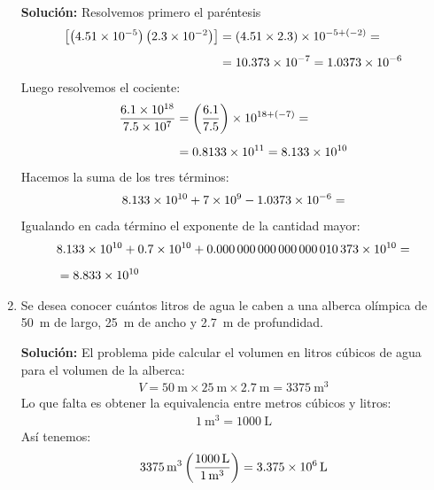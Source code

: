\documentclass[14pt]{extarticle}
\begin{document}
\begin{enumerate}
\textbf{Solución:} Resolvemos primero el paréntesis
\begin{align*}
\left[ \left( \num{4.51d-5} \right) \left( \num{2.3d-2} \right)\right] &= (4.51 \times 2.3) \times 10^{-5+(-2)} = \\[0.5em]
&= \num{10.373d-7} = \num{1.0373d-6}
\end{align*}
Luego resolvemos el cociente:
\begin{align*}
\dfrac{\num{6.1d18}}{\num{7.5d7}} &= \left( \dfrac{6.1}{7.5} \right) \times 10^{18 + (-7)} = \\[0.5em]
&= \num{0.8133d11} = \num{8.133d10}
\end{align*}
Hacemos la suma de los tres términos:
\begin{align*}
\num{8.133d10} + \num{7d9} - \num{1.0373d-6} =
\end{align*}
Igualando en cada término el exponente de la cantidad mayor:
\begin{align*}
&\num{8.133d10} + \num{0.7d10} + \num{0.000000000000000010373d10} = \\[0.5em]
&= \num{8.833d10}
\end{align*}
\item Se desea conocer cuántos litros de agua le caben a una alberca olímpica de \SI{50}{\meter} de largo,
\SI{25}{\meter} de ancho y \SI{2.7}{\meter} de profundidad.

\textbf{Solución:} El problema pide calcular el volumen en litros cúbicos de agua para el volumen de la alberca:
\begin{align*}
V = \SI{50}{\meter} \times \SI{25}{\meter} \times \SI{2.7}{\meter} = \SI{3375}{\cubic\meter}
\end{align*}
Lo que falta es obtener la equivalencia entre metros cúbicos y litros:
\begin{align*}
\SI{1}{\cubic\meter} = \SI{1000}{\liter}
\end{align*}
Así tenemos:
\begin{align*}
\SI{3375}{\cubic\meter} \left( \dfrac{\SI{1000}{\liter}}{\SI{1}{\cubic\meter}} \right) = \SI{3.375d6}{\liter}
\end{align*}
\end{enumerate}
\end{document}
